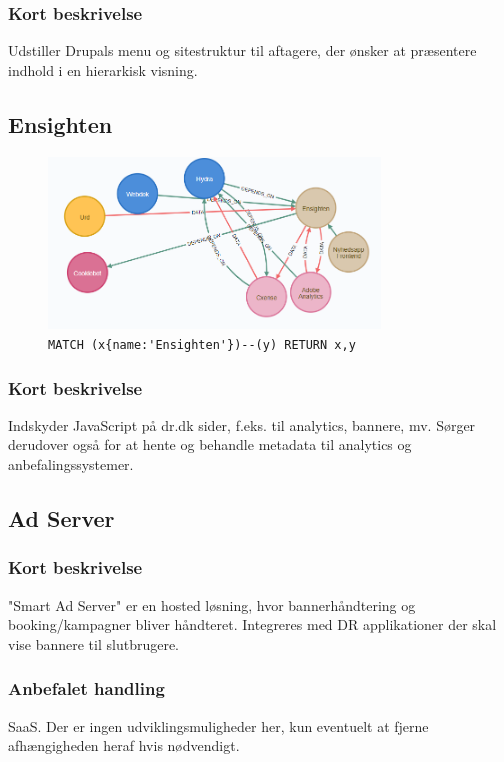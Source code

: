 \documentclass{article}
\begin{document}
\subsubsection*{Kort beskrivelse}
Udstiller Drupals menu og sitestruktur til aftagere, der ønsker at præsentere indhold i en hierarkisk visning.


\subsection{Ensighten}
\begin{figure}[H]
\includegraphics[width=250pt]{Ensighten.PNG}
\cprotect\caption{\verb|MATCH (x{name:'Ensighten'})--(y) RETURN x,y|}
\end{figure}
\subsubsection*{Kort beskrivelse}
Indskyder JavaScript på dr.dk sider, f.eks. til analytics, bannere, mv. Sørger derudover også for at hente og behandle metadata til analytics og anbefalingssystemer.



\subsection{Ad Server}
\subsubsection*{Kort beskrivelse}
"Smart Ad Server" er en hosted løsning, hvor bannerhåndtering og booking/kampagner bliver håndteret. Integreres med DR applikationer der skal vise bannere til slutbrugere.
\subsubsection*{Anbefalet handling}
SaaS. Der er ingen udviklingsmuligheder her, kun eventuelt at fjerne afhængigheden heraf hvis nødvendigt.
\end{document}
